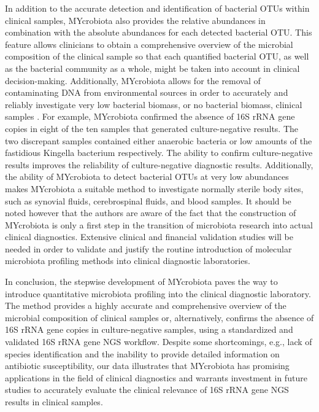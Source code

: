 In addition to the accurate detection and identification of bacterial OTUs within clinical samples, MYcrobiota also provides the relative
abundances in combination with the absolute abundances for each detected bacterial OTU. This feature allows clinicians to obtain a comprehensive
overview of the microbial composition of the clinical sample so that each quantified bacterial OTU, as well as the bacterial community as a whole,
might be taken into account in clinical decision-making. Additionally, MYcrobiota allows for the removal of contaminating DNA from environmental
sources in order to accurately and reliably investigate very low bacterial biomass, or no bacterial biomass, clinical samples \cite{boers2017novel}. For example,
MYcrobiota confirmed the absence of 16S rRNA gene copies in eight of the ten samples that generated culture-negative results. The two discrepant
samples contained either anaerobic bacteria or low amounts of the fastidious Kingella bacterium respectively. The ability to confirm culture-negative
results improves the reliability of culture-negative diagnostic results. Additionally, the ability of MYcrobiota to detect bacterial OTUs at very low
abundances makes MYcrobiota a suitable method to investigate normally sterile body sites, such as synovial fluids, cerebrospinal fluids, and blood samples.
It should be noted however that the authors are aware of the fact that the construction of MYcrobiota is only a first step in the transition of microbiota
research into actual clinical diagnostics. Extensive clinical and financial validation studies will be needed in order to validate and justify the routine
introduction of molecular microbiota profiling methods into clinical diagnostic laboratories.

In conclusion, the stepwise development of MYcrobiota paves the way to introduce quantitative microbiota profiling into the clinical diagnostic
laboratory. The method provides a highly accurate and comprehensive overview of the microbial composition of clinical samples or, alternatively,
confirms the absence of 16S rRNA gene copies in culture-negative samples, using a standardized and validated 16S rRNA gene NGS workflow. Despite
some shortcomings, e.g., lack of species identification and the inability to provide detailed information on antibiotic susceptibility, our data
illustrates that MYcrobiota has promising applications in the field of clinical diagnostics and warrants investment in future studies to accurately
evaluate the clinical relevance of 16S rRNA gene NGS results in clinical samples.

